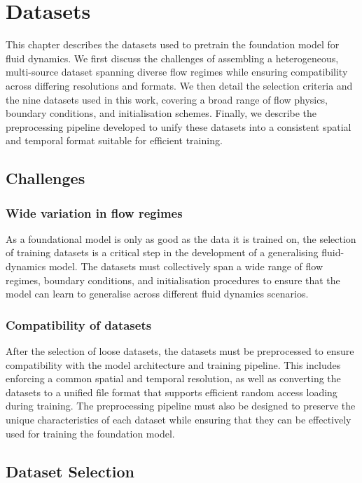 
\chapter{Datasets}
\label{ch:datasets}

This chapter describes the datasets used to pretrain the foundation model for fluid dynamics. We first discuss the challenges of assembling a heterogeneous, multi-source dataset spanning diverse flow regimes while ensuring compatibility across differing resolutions and formats. We then detail the selection criteria and the nine datasets used in this work, covering a broad range of flow physics, boundary conditions, and initialisation schemes. Finally, we describe the preprocessing pipeline developed to unify these datasets into a consistent spatial and temporal format suitable for efficient training.

\section{Challenges}


\subsection{Wide variation in flow regimes}

As a foundational model is only as good as the data it is trained on, the selection of training datasets is a critical step in the development of a generalising fluid-dynamics model. The datasets must collectively span a wide range of flow regimes, boundary conditions, and initialisation procedures to ensure that the model can learn to generalise across different fluid dynamics scenarios.

\subsection{Compatibility of datasets}

After the selection of loose datasets, the datasets must be preprocessed to ensure compatibility with the model architecture and training pipeline. This includes enforcing a common spatial and temporal resolution, as well as converting the datasets to a unified file format that supports efficient random access loading during training. The preprocessing pipeline must also be designed to preserve the unique characteristics of each dataset while ensuring that they can be effectively used for training the foundation model.


\section{Dataset Selection}
\label{se:datasetselection}
 
